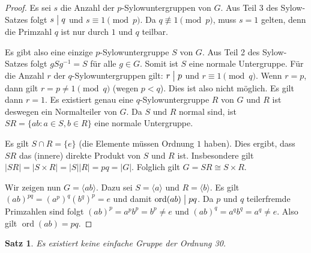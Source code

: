 \documentclass[12pt]{scrartcl} %
\DeclareMathOperator{\ord}{ord}
\newcommand{\divides}{\mathrel{\bigm|}}
\newtheorem{thm}{Satz}[section]
\theoremstyle{definition}
\theoremstyle{remark}
\begin{document}
\begin{proof}
	Es sei $s$ die Anzahl der $p$-Sylowuntergruppen von $G$. Aus Teil 3 des Sylow-Satzes folgt $s \divides q$ und $s \equiv 1 \pmod{p}$. Da $q \not \equiv 1 \pmod{p}$, muss $s = 1$ gelten, denn die Primzahl $q$ ist nur durch $1$ und $q$ teilbar. 

	Es gibt also eine einzige $p$-Sylowuntergruppe $S$ von $G$. Aus Teil 2 des Sylow-Satzes folgt $gSg^{-1} = S$ für alle $g \in G$. Somit ist $S$ eine normale Untergruppe. %
	Für die Anzahl $r$ der $q$-Sylowuntergruppen gilt: $r \divides p$ und $r \equiv 1 \pmod{q}$. Wenn $r = p$, dann gilt $r = p \not = 1 \pmod{q}$ (wegen $p < q$). Dies ist also nicht möglich. Es gilt dann $r = 1$. Es existiert genau eine $q$-Sylowuntergruppe $R$ von $G$ und $R$ ist deswegen ein Normalteiler von $G$. Da $S$ und $R$ normal sind, ist $SR = \{ ab : a \in S, b \in R\}$ eine normale Untergruppe. 

	Es gilt $S \cap R = \{ e\}$ (die Elemente müssen Ordnung $1$ haben). Dies ergibt, dass $SR$ das (innere) direkte Produkt von $S$ und $R$ ist. Insbesondere gilt $|SR| = |S \times R| = |S||R| = pq = |G|$. Folglich gilt $G = SR \cong S \times R$. 

        Wir zeigen nun $G = \langle ab \rangle$. Dazu sei $S =  \langle a \rangle$ und $R =  \langle b \rangle$. Es gilt $ (ab)^{pq} = (a^p)^q (b^q)^p = e$ und damit $\ord(ab) \divides pq$. Da $p$ und $q$ teilerfremde Primzahlen sind folgt $ (ab)^p = a^p b^p = b^p \neq e$ und  $(ab)^q = a^q b^q = a^q \neq e$. Also gilt $\ord(ab) = pq$.
\end{proof}

\begin{thm}
	Es existiert keine einfache Gruppe der Ordnung 30.
\end{thm}
\end{document}
